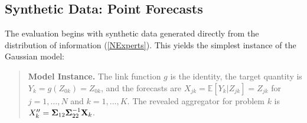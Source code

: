 \documentclass[11pt]{article}
\newcommand{\E}{\mathbb{E}}
\theoremstyle{definition}
\theoremstyle{definition}
\def\bSigma{{\bf \Sigma}}
\def\X{{\bf X}}
\def\E{{\mathbb E}}
\begin{document}




\subsection{Synthetic Data: Point Forecasts}
\label{simulation}
The evaluation begins with synthetic data generated directly from the distribution of information (\ref{NExperts}). This yields the simplest instance of the Gaussian model:

\begin{quote}
{\bf Model Instance.}  The link function $g$ is the identity, the target quantity is $Y_k = g(Z_{0k}) = Z_{0k}$, and the forecasts are $X_{jk} = \E[Y_k | Z_{jk}] = Z_{jk}$ for $j = 1, \dots, N$ and $k = 1, \dots, K$. The revealed aggregator for problem $k$ is $X_k'' = \bSigma_{12} \bSigma_{22}^{-1} \X_k$. 
\end{quote}
\end{document}
